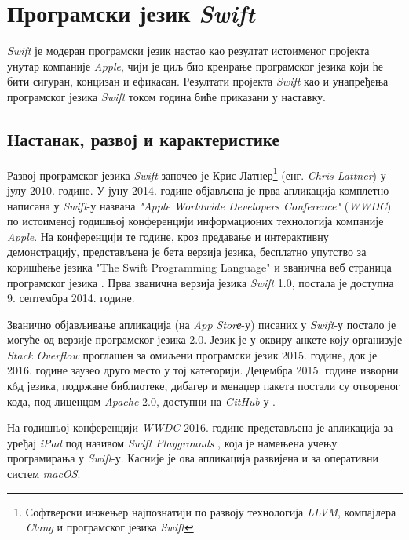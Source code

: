 \documentclass[12pt,oneside]{memoir}
\begin{document}
\chapter{Програмски језик \textit{Swift}}

\indent \textit{Swift} је модеран програмски језик настао као резултат истоименог пројекта унутар компаније \textit{Apple}, чији је циљ био креирање програмског језика  који ће бити сигуран, концизан и ефикасан. Резултати пројекта \textit{Swift} као и унапређења програмског језика \textit{Swift} током година биће приказани у наставку. 

\section{Настанак, развој и карактеристике}

\indent Развој програмског језика \textit{Swift} започео је Крис Латнер\footnote{Софтверски инжењер најпознатији по развоју технологија \textit{LLVM}, компајлера \textit{Clang} и програмског језика \textit{Swift}} (енг. \textit{Chris Lattner}) у јулу 2010. године. У јуну 2014. године објављена је прва апликација комплетно написана у \textit{Swift}-у названа \textit{"Apple Worldwide Developers Conference"} (\textit{WWDC}) по истоименој годишњој конференцији информационих технологија компаније \textit{Apple}. На конференцији те године, кроз предавање и интерактивну демонстрацију, представљена је бета верзија језика, бесплатно упутство за коришћење језика "The Swift Programming Language" \cite{The_Swift_Programming_Language} и званична веб страница програмског језика \cite{SwiftOfficialSite}. Прва званична верзија језика \textit{Swift} 1.0, постала је доступна 9. септембра 2014. године.

\indent Званично објављивање апликација (на \textit{App Storе}-у) писаних у \textit{Swift}-у постало је могуће од верзије програмског језика 2.0. Језик је у оквиру анкете коју организује  \textit{Stack Overflow}  \cite{StackOverflow} проглашен за омиљени програмски језик 2015. године, док је 2016. године заузео друго место у тој категорији. Децембра 2015. године изворни к\^{o}д језика, подржане библиотеке, дибагер и менаџер пакета постали су отвореног кода, под лиценцом \textit{Apache} 2.0, доступни на \textit{GitHub}-у \cite{GitHub_Swift}.

\indent На годишњој конференцији \textit{WWDC} 2016. године представљена је апликација за уређај \textit{iPad} под називом \textit{Swift Playgrounds} \cite{Swift_Playground}, која је намењена учењу програмирања у \textit{Swift}-у. Касније је ова апликација развијена и за оперативни систем \textit{macOS}.
\end{document}
